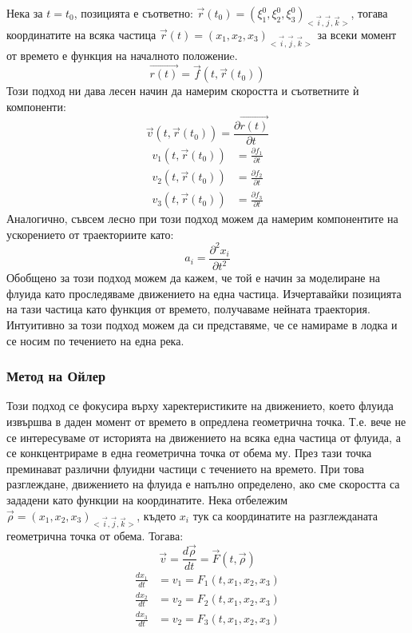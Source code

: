 Нека за $t= t_0$, позицията е съответно: $\vec{r}(t_0) = (\xi^{0}_1,\xi^{0}_2,\xi^{0}_3)_{<\vec{i}, \vec{j}, \vec{k}>}$, тогава координатите на всяка частица $\vec{r}(t) = (x_1,x_2,x_3)_{<\vec{i}, \vec{j}, \vec{k}>}$ за 
всеки момент от времето е функция на началното положениe.
\begin{equation}
	\vec{r(t)} = \vec{f}(t, \vec{r}(t_0))
\end{equation}
Този подход ни дава лесен начин да намерим скоростта и съответните ѝ компоненти:
\begin{equation}
	\vec{v}(t, \vec{r}(t_0)) =  \frac{\partial \vec{r(t)}}{\partial t}
\end{equation}
\begin{align*}
	v_1 (t, \vec{r}(t_0)) & =  \frac{\partial f_1}{\partial t} \\
	v_2 (t, \vec{r}(t_0)) & =  \frac{\partial f_2}{\partial t} \\
	v_3 (t, \vec{r}(t_0)) & =  \frac{\partial f_3}{\partial t} 
\end{align*}
Аналогично, съвсем лесно при този подход можем да намерим компонентите на ускорението от траекториите като:
\begin{equation}
	a_{i} = \frac{\partial^2 x_i}{\partial t^2}
\end{equation}
Обобщено за този подход можем да кажем, че той е начин за моделиране на флуида като проследяваме движението на една частица. Изчертавайки позицията на тази частица като функция от времето, получаваме нейната траектория. Интуитивно за този подход
можем да си представяме, че се намираме в лодка и се носим по течението на една река. 

\subsubsection{Метод на Ойлер}
Този подход се фокусира върху харектеристиките на движението, което флуида извършва в даден момент от времето в опредлена геометрична точка. Т.е. вече не се интересуваме от историята на движението на всяка една частица от флуида, а се конкцентрираме
в една геометрична точка от обема му. През тази точка преминават различни флуидни частици с течението на времето. При това разглеждане, движението на флуида е напълно определено, ако сме скоростта са зададени като функции на координатите. Нека отбележим $\vec{\rho} = (x_1,x_2,x_3)_{<\vec{i}, \vec{j}, \vec{k}>}$,
където $x_i$ тук са координатите на разглежданата геометрична точка от обема. Тогава:
\begin{equation}
	\vec{v} = \frac{d \vec{\rho}}{d t} = \vec{F}(t, \vec{\rho})
\end{equation}
\begin{align*}
	\frac{d x_1}{d t} & = v_1 = F_1(t, x_1, x_2, x_3) \\
	\frac{d x_2}{d t} & = v_2 = F_2(t, x_1, x_2, x_3) \\
	\frac{d x_3}{d t} & = v_2 = F_3(t, x_1, x_2, x_3) 
\end{align*}

